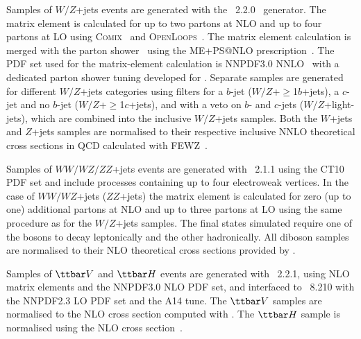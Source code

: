 Samples of $W/Z$+jets events are generated with the {\sherpa}~2.2.0~\cite{Gleisberg:2008ta} generator. 
The matrix element is calculated for up to two partons at NLO and up to four partons at LO using 
\textsc{Comix}~\cite{Gleisberg:2008fv} and \textsc{OpenLoops}~\cite{Cascioli:2011va}. The matrix element calculation 
is merged with the {\sherpa} parton shower~\cite{Schumann:2007mg} using the ME+PS@NLO prescription~\cite{Hoeche:2012yf}. 
The PDF set used for the matrix-element calculation is NNPDF3.0 NNLO~\cite{Ball:2014uwa} with a dedicated parton shower tuning developed for {\sherpa}. 
Separate samples are generated for different $W/Z$+jets categories using filters for a $b$-jet 
($W/Z$+$\geq$1$b$+jets), a $c$-jet and no $b$-jet ($W/Z$+$\geq$1$c$+jets), and with a veto on $b$- and $c$-jets 
($W/Z$+light-jets), which are combined into the inclusive $W/Z$+jets samples.
Both the $W$+jets and $Z$+jets samples are normalised to their respective inclusive NNLO theoretical 
cross sections in QCD calculated with \textsc{FEWZ}~\cite{Anastasiou:2003ds}.

Samples of $WW/WZ/ZZ$+jets events are generated with {\sherpa}~2.1.1 using the CT10 PDF set
and include processes containing up to four electroweak vertices. 
In the case of $WW/WZ$+jets ($ZZ$+jets) the matrix element is calculated for zero (up to one) additional partons 
at NLO and up to three partons at LO using the same procedure as for the $W/Z$+jets samples. 
The final states simulated require one of the bosons to decay leptonically and the other hadronically.
All diboson samples are normalised to their NLO theoretical cross sections provided by {\sherpa}. 

Samples of $\ttbar V$ and $\ttbar H$ events are generated with {\amcatnlo}~2.2.1, using NLO matrix elements and the NNPDF3.0 NLO PDF set,
and interfaced to {\pythia}~8.210 with the NNPDF2.3 LO PDF set and the A14 tune.
The $\ttbar V$ samples are normalised to the NLO cross section computed with {\amcatnlo}.
The $\ttbar H$ sample is normalised using the NLO cross section~\cite{Raitio:1978pt,Beenakker:2002nc,Dawson:2003zu,Yu:2014cka,Frixione:2015zaa}. 


